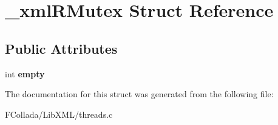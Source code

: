 \hypertarget{struct__xmlRMutex}{
\section{\_\-xmlRMutex Struct Reference}
\label{struct__xmlRMutex}
}
\subsection*{Public Attributes}
\begin{DoxyCompactItemize}
\item 
\hypertarget{struct__xmlRMutex_ae6811da98688fb42e1720626ac61f3c4}{
int {\bfseries empty}}
\label{struct__xmlRMutex_ae6811da98688fb42e1720626ac61f3c4}

\end{DoxyCompactItemize}


The documentation for this struct was generated from the following file:\begin{DoxyCompactItemize}
\item 
FCollada/LibXML/threads.c\end{DoxyCompactItemize}
